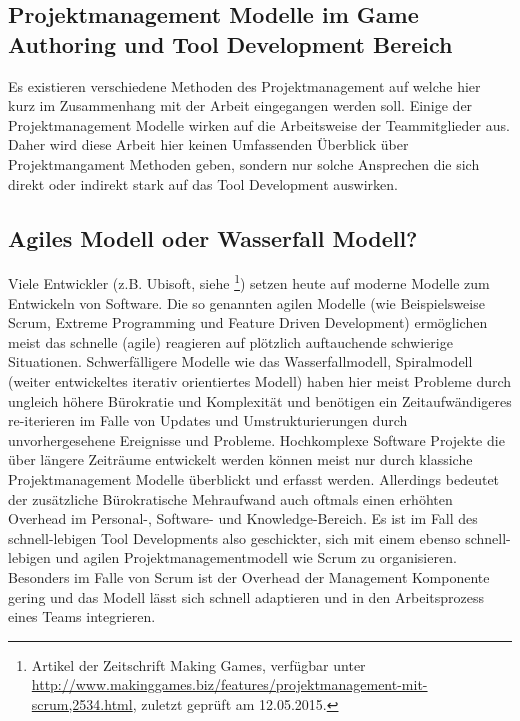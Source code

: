 \documentclass[pagesize, paper=a4, fontsize=12pt, titlepage=true, headings=small, headnosepline, abstractoff, liststotoc, nochapterprefix, plainheadsepline, twoside]{scrreprt}
\begin{document}
\subsection{Projektmanagement Modelle im Game Authoring und Tool Development Bereich}
Es existieren verschiedene Methoden des Projektmanagement auf welche hier kurz im Zusammenhang mit der Arbeit eingegangen werden soll. Einige der Projektmanagement Modelle wirken auf die Arbeitsweise der Teammitglieder aus. Daher wird diese Arbeit hier keinen Umfassenden Überblick über Projektmangament Methoden geben, sondern nur solche Ansprechen die sich direkt oder indirekt stark auf das Tool Development auswirken.

\subsection{Agiles Modell oder Wasserfall Modell?}
Viele Entwickler (z.B. Ubisoft, siehe \cite{MKG:Schmitz2014}\footnote{Artikel der Zeitschrift Making Games, verfügbar unter \url{http://www.makinggames.biz/features/projektmanagement-mit-scrum,2534.html}, zuletzt geprüft am 12.05.2015.}) setzen heute auf moderne Modelle zum Entwickeln von Software. Die so genannten agilen Modelle (wie Beispielsweise Scrum,  Extreme Programming und Feature Driven Development) ermöglichen meist das schnelle (agile) reagieren auf plötzlich auftauchende schwierige Situationen. Schwerfälligere Modelle wie das Wasserfallmodell, Spiralmodell (weiter entwickeltes iterativ orientiertes Modell) haben hier meist Probleme durch ungleich höhere Bürokratie und Komplexität und benötigen ein Zeitaufwändigeres re-iterieren im Falle von Updates und Umstrukturierungen durch unvorhergesehene Ereignisse und Probleme. Hochkomplexe Software Projekte die über längere Zeiträume entwickelt werden können meist nur durch klassiche Projektmanagement Modelle überblickt und erfasst werden. Allerdings bedeutet der zusätzliche Bürokratische Mehraufwand auch oftmals einen erhöhten Overhead im Personal-, Software- und Knowledge-Bereich. Es ist im Fall des schnell-lebigen Tool Developments also geschickter, sich mit einem ebenso schnell-lebigen und agilen Projektmanagementmodell wie Scrum zu organisieren. Besonders im Falle von Scrum ist der Overhead der Management Komponente gering und das Modell lässt sich schnell adaptieren und in den Arbeitsprozess eines Teams integrieren.
\end{document}
